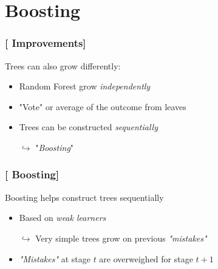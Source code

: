 \documentclass[xcolor=x11names,compress, aspectratio=169]{beamer}
\renewcommand{\(}{\begin{columns}}
\renewcommand{\)}{\end{columns}}
\newcommand{\<}[1]{\begin{column}{#1}}
\renewcommand{\>}{\end{column}}
\begin{document}
\section{Boosting}

\begin{frame}
\frametitle{\textcolor{brique}{[ Improvements]}}
Trees can also grow differently:
\pause
 \begin{itemize}[<+->]
    \item Random Forest grow \textit{independently}
    \item "Vote" or average of the outcome from leaves
    \item Trees can be constructed \textit{sequentially}
    \item[$\hookrightarrow$] "\emph{Boosting}"
 \end{itemize}
\end{frame}

\begin{frame}
\frametitle{\textcolor{brique}{[ Boosting]}}
Boosting helps construct trees sequentially
\pause
 \begin{itemize}[<+->]
    \item Based on \textit{weak learners}
    \item[$\hookrightarrow$] Very simple trees grow on previous \textit{"mistakes"}
    \item \textit{"Mistakes"} at stage $t$  are overweighed for stage $t+1$
 \end{itemize}
\end{frame}
\end{document}
